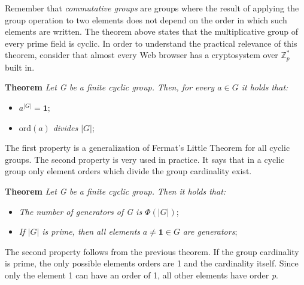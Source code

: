 \documentclass[11pt, a4paper]{article}
\newcommand{\idElement}{
    \textbf{1}
}
\begin{document}
Remember that \textit{commutative groups} are groups where the result of applying the group operation to two elements does not depend on the order in which such elements are written. The theorem above states that the multiplicative group of every prime field is cyclic. In order to understand the practical relevance of this theorem, consider that almost every Web browser has a cryptosystem over $\mathbb{Z}_p^*$ built in.
\begin{framed}
    \hfill\break\textbf{Theorem} \textit{Let G be a finite cyclic group. Then, for every $a\in G$ it holds that:}
    \begin{itemize}
        \item $a^{|G|}=\idElement$;
        \item $\text{ord}(a)$ \textit{divides $|G|$};
    \end{itemize}
\end{framed}
The first property is a generalization of Fermat's Little Theorem for all cyclic groups. The second property is very used in practice. It says that in a cyclic group only element orders which divide the group cardinality exist.

\newpage
\begin{framed}
    \hfill\break\textbf{Theorem} \textit{Let G be a finite cyclic group. Then it holds that:}
    \begin{itemize}
        \item \textit{The number of generators of G is $\Phi(|G|)$};
        \item \textit{If $|G|$ is prime, then all elements} $a\not=\idElement\in G$ \textit{are generators};
    \end{itemize}
\end{framed}
The second property follows from the previous theorem. If the group cardinality is prime, the only possible elements orders are 1 and the cardinality itself. Since only the element 1 can have an order of 1, all other elements have order \textit{p}.
\end{document}
